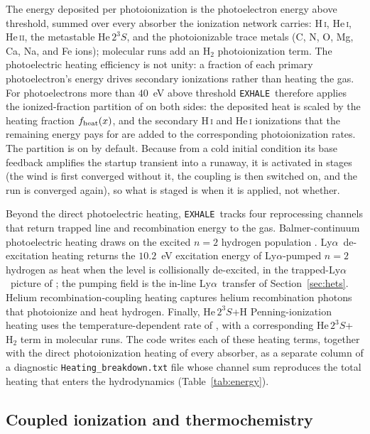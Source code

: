 \documentclass[twocolumn]{aastex702}
\newcommand{\EXHALE}{\texttt{EXHALE}}
\newcommand{\HeTS}{\mathrm{He}\,2^{3}S}
\newcommand{\Lya}{\mbox{Ly}\ensuremath{\alpha}}
\begin{document}
The energy deposited per photoionization is the photoelectron energy above threshold,
summed over every absorber the ionization network carries: \mbox{H\,\textsc{i}},
\mbox{He\,\textsc{i}}, \mbox{He\,\textsc{ii}}, the metastable $\HeTS$, and the
photoionizable trace metals (C, N, O, Mg, Ca, Na, and Fe ions); molecular runs add an
\mbox{H$_2$} photoionization term. The photoelectric heating efficiency is not unity: a
fraction of each primary photoelectron's energy drives secondary ionizations rather than
heating the gas. For photoelectrons more than $40$~eV above threshold \EXHALE\ therefore
applies the ionized-fraction partition of \citet{ShullVanSteenberg1985} on both sides:
the deposited heat is scaled by the heating fraction $f_{\rm heat}(x)$, and the secondary
\mbox{H\,\textsc{i}} and \mbox{He\,\textsc{i}} ionizations that the remaining energy pays
for are added to the corresponding photoionization rates. The partition is on by default.
Because from a cold initial condition its base feedback amplifies the startup transient
into a runaway, it is activated in stages (the wind is first converged without it, the
coupling is then switched on, and the run is converged again), so what is staged is when
it is applied, not whether.

Beyond the direct photoelectric heating, \EXHALE\ tracks four reprocessing channels that
return trapped line and recombination energy to the gas. Balmer-continuum photoelectric
heating draws on the excited $n=2$ hydrogen population \citep{Christie2013,Huang2017}.
\Lya\ de-excitation heating returns the $10.2$~eV excitation energy of \Lya-pumped $n=2$
hydrogen as heat when the level is collisionally de-excited, in the trapped-\Lya\ picture
of \citet{Huang2023}; the pumping field is the in-line \Lya\ transfer of
Section~\ref{sec:hets}. Helium recombination-coupling heating captures helium
recombination photons that photoionize and heat hydrogen. Finally, $\HeTS$+H
Penning-ionization heating uses the temperature-dependent rate of \citet{Taylor2025},
with a corresponding $\HeTS$+$\mathrm{H_2}$ term in molecular runs. The code writes each
of these heating terms, together with the direct photoionization heating of every
absorber, as a separate column of a diagnostic \texttt{Heating\_breakdown.txt} file whose
channel sum reproduces the total heating that enters the hydrodynamics
(Table~\ref{tab:energy}).

\subsection{Coupled ionization and thermochemistry}
\label{sec:ioniz}
\end{document}
